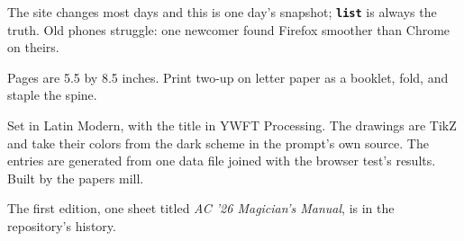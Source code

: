 \documentclass[10pt,twoside]{article}
\newcommand{\spl}[1]{\texttt{\bfseries #1}}
\newcommand{\backhead}[1]{\par\addvspace{1.1em}\noindent{\small\scshape #1}\par\nopagebreak\vspace{0.25em}}
\begin{document}
\backhead{Catches}
{\footnotesize\noindent The site changes most days and this is one day's snapshot; \spl{list} is always the truth. Old phones struggle: one newcomer found Firefox smoother than Chrome on theirs.\par}

\vspace{0.8em}
{\footnotesize


}
\clearpage
{}
\vspace*{2em}
\par\vspace{0.4em}
{\small\noindent Pages are 5.5 by 8.5 inches. Print two-up on letter paper as a booklet, fold, and staple the spine.\par\smallskip\noindent Set in Latin Modern, with the title in YWFT Processing. The drawings are TikZ and take their colors from the dark scheme in the prompt's own source. The entries are generated from one data file joined with the browser test's results. Built by the papers mill.\par\smallskip\noindent The first edition, one sheet titled \emph{AC '26 Magician's Manual}, is in the repository's history.\par}
\end{document}
